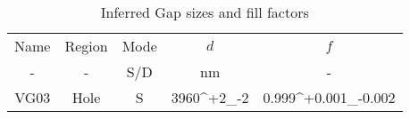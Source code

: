 \begin{table}[h!]
\caption{Inferred Gap sizes and fill factors \label{tbl_DerivedGapSizes}}
\begin{center}
    \begin{tabular}{ c c c c c }
    \hline
    Name & Region & Mode & $d$  &  $f$ \\ 
    -  & - & S/D & nm & - \\
    \hline

    VG03 & Hole   &   S  & 3960^{+2}_{-2} &  0.999^{+0.001}_{-0.002}\\

    \hline
    \end{tabular}
\end{center}
\end{table}